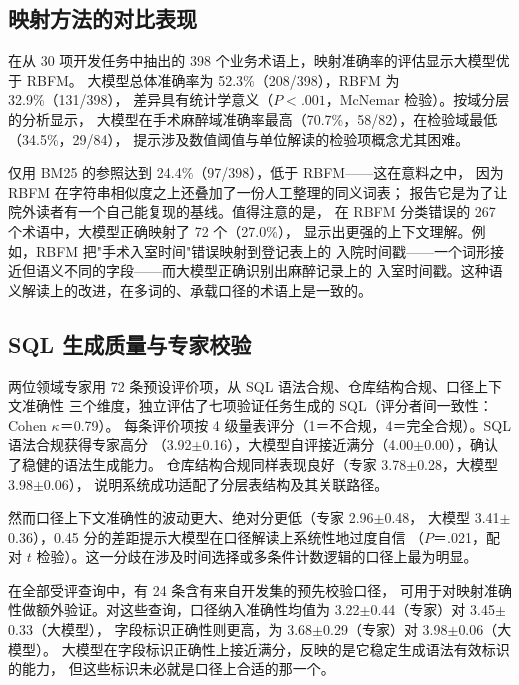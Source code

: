 \documentclass[11pt,a4paper]{article}
\begin{document}
\subsection{映射方法的对比表现}
在从 30 项开发任务中抽出的 398 个业务术语上，映射准确率的评估显示大模型优于 RBFM。
大模型总体准确率为 52.3\%（208/398），RBFM 为 32.9\%（131/398），
差异具有统计学意义（$P<.001$，McNemar 检验）。按域分层的分析显示，
大模型在手术麻醉域准确率最高（70.7\%，58/82），在检验域最低（34.5\%，29/84），
提示涉及数值阈值与单位解读的检验项概念尤其困难。

仅用 BM25 的参照达到 24.4\%（97/398），低于 RBFM——这在意料之中，
因为 RBFM 在字符串相似度之上还叠加了一份人工整理的同义词表；
报告它是为了让院外读者有一个自己能复现的基线。值得注意的是，
在 RBFM 分类错误的 267 个术语中，大模型正确映射了 72 个（27.0\%），
显示出更强的上下文理解。例如，RBFM 把"手术入室时间"错误映射到登记表上的
入院时间戳——一个词形接近但语义不同的字段——而大模型正确识别出麻醉记录上的
入室时间戳。这种语义解读上的改进，在多词的、承载口径的术语上是一致的。

\subsection{SQL 生成质量与专家校验}
两位领域专家用 72 条预设评价项，从 SQL 语法合规、仓库结构合规、口径上下文准确性
三个维度，独立评估了七项验证任务生成的 SQL（评分者间一致性：Cohen $\kappa$＝0.79）。
每条评价项按 4 级量表评分（1＝不合规，4＝完全合规）。SQL 语法合规获得专家高分
（3.92$\pm$0.16），大模型自评接近满分（4.00$\pm$0.00），确认了稳健的语法生成能力。
仓库结构合规同样表现良好（专家 3.78$\pm$0.28，大模型 3.98$\pm$0.06），
说明系统成功适配了分层表结构及其关联路径。

然而口径上下文准确性的波动更大、绝对分更低（专家 2.96$\pm$0.48，
大模型 3.41$\pm$0.36），0.45 分的差距提示大模型在口径解读上系统性地过度自信
（$P$＝.021，配对 $t$ 检验）。这一分歧在涉及时间选择或多条件计数逻辑的口径上最为明显。

在全部受评查询中，有 24 条含有来自开发集的预先校验口径，
可用于对映射准确性做额外验证。对这些查询，口径纳入准确性均值为
3.22$\pm$0.44（专家）对 3.45$\pm$0.33（大模型），
字段标识正确性则更高，为 3.68$\pm$0.29（专家）对 3.98$\pm$0.06（大模型）。
大模型在字段标识正确性上接近满分，反映的是它稳定生成语法有效标识的能力，
但这些标识未必就是口径上合适的那一个。
\end{document}
